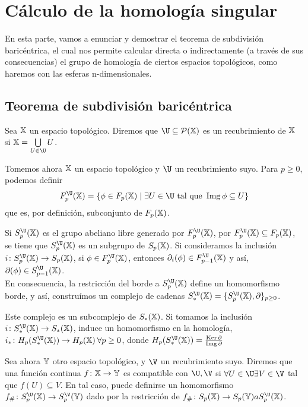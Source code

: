 \chapter{Cálculo de la homología singular}\label{ch:introduccion}

En esta parte, vamos a enunciar y demostrar el teorema de subdivisión baricéntrica,
el cual nos permite calcular directa o indirectamente (a través de sus consecuencias)
el grupo de homología de ciertos espacios topológicos, como haremos con las esferas
n-dimensionales.

\section{Teorema de subdivisión baricéntrica}

\begin{definition}
  Sea ${\mathbb X}$ un espacio topológico. Diremos que $\U \subseteq \mathcal P(\X)$ es un recubrimiento de ${\mathbb X}$ si $\X = \bigcup\limits_{U \in \U} U$.
\end{definition}

Tomemos ahora ${\mathbb X}$ un espacio topológico y $\U$ un recubrimiento suyo. Para $ p \geq 0$, podemos definir
\[ F_p^\U(\X) = \{\phi \in F_p(\X) \mid \exists U \in \U \text{ tal que } \Img \phi \subseteq U\} \]
que es, por definición, subconjunto de $F_p({\mathbb X})$.

Si $S_p^\U(\X)$ es el grupo abeliano libre generado por $F_p^\U(\X)$, por $F_p^\U(\X) \subseteq F_p(\X)$, se tiene
que $S_p^\U(\X)$ es un subgrupo de $S_p({\mathbb X})$. Si consideramos la inclusión $i \colon S_p^\U(\X) \to S_p(\X)$, si
$\phi \in F_p^\U(\X)$, entonces $\partial_i(\phi) \in F_{p-1}^\U(\X)$ y así, $\partial(\phi) \in S_{p-1}^\U(\X)$. \\
En consecuencia, la restricción del borde a $S_p^\U(\X)$ define un homomorfismo borde, y así, construímos un complejo
de cadenas $S_*^\U(\X) = \{S_p^\U(\X), \partial\}_{p \geq 0}$.

Este complejo es un subcomplejo de $S_*({\mathbb X})$. Si tomamos la inclusión $i \colon S_*^\U(\X) \to S_*(\X)$, induce un
homomorfismo en la homología, $i_* \colon H_p(S_*^\U(\X)) \to H_p(\X) \hspace{0.2em} \forall p \geq 0$, donde
$H_p(S_*^\U(\X)) = \frac{\Ker \partial}{\Img \partial}$

Sea ahora ${\mathbb Y}$ otro espacio topológico, y $\V$ un recubrimiento suyo. Diremos que una función continua $f \colon {\mathbb X} \to {\mathbb Y}$ es compatible
con $\U, \V$ si $\forall U \in \U \exists V \in \V$ tal que $f(U) \subseteq V$. En tal caso, puede definirse un homomorfismo
$f_\# \colon S_p^\U(\X) \to S_p^\V(\Y)$ dado por la restricción de $f_\# \colon \SX{p} \to \SY{p} a S_p^\U(\X)$.

